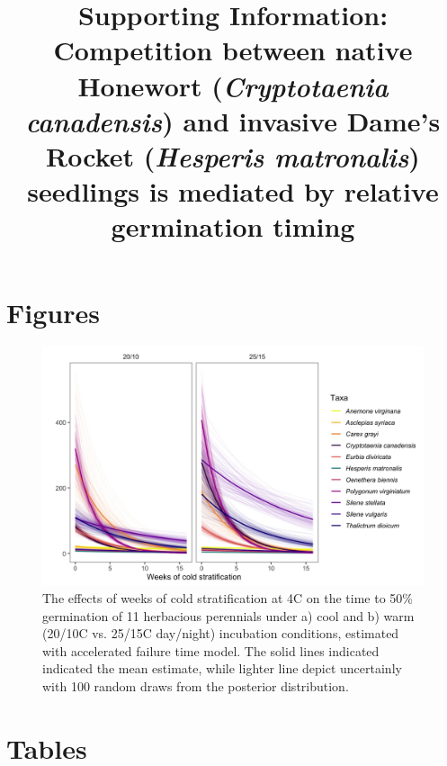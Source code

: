\documentclass{article}\usepackage[]{graphicx}\usepackage[]{color}
\title{Supporting Information: Competition between native Honewort (\textit{Cryptotaenia canadensis}) and invasive Dame's Rocket (\textit{Hesperis matronalis}) seedlings is mediated by relative germination timing}
\begin{document}
\maketitle
\section{Figures}
\begin{figure}[h!]
    \centering
\includegraphics[width=\textwidth]{..//figure/AFTall.jpeg}
   \caption{The effects of weeks of cold stratification at 4\degree C on the time to 50\% germination of 11 herbacious perennials under a) cool and b) warm (20/10\degree C vs. 25/15\degree C day/night) incubation conditions, estimated with accelerated failure time model. The solid lines indicated indicated the mean estimate, while lighter line depict uncertainly with 100 random draws from the posterior distribution.} 
   \label{fig:AFTall}
\end{figure}

\section{Tables}
\end{document}
